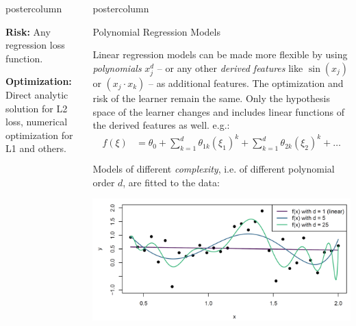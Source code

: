 \documentclass{beamer}
\newlength{\columnheight} %
\begin{document}
\begin{frame}[fragile]{}
\begin{columns}
\begin{column}{.31\textwidth}
\begin{beamercolorbox}[center]{postercolumn}
\begin{minipage}{.98\textwidth}
{\begin{myblock}
  \textbf{Risk:} Any regression loss function.
  
  \vspace*{1ex}
  
  \textbf{Optimization:} Direct analytic solution for L2 loss, numerical optimization for L1 and others.
  \end{myblock}
  
}
\end{minipage}
\end{beamercolorbox}
\end{column}
\begin{column}{.31\textwidth}
\begin{beamercolorbox}[center]{postercolumn}
\begin{minipage}{.98\textwidth}
\parbox[t][\columnheight]{\textwidth}{
  \begin{myblock}{Polynomial Regression Models}
  
    Linear regression models can be made more flexible by using \emph{polynomials} $x_j^d$ -- or any other \emph{derived features} like $\sin(x_j)$ or $(x_j \cdot x_k)$ -- as additional features. The optimization and risk of the learner remain the same.\vspace*{1ex}
    Only the hypothesis space of the learner changes and includes linear functions of the derived features as well. e.g.:
      \begin{align*}
    f(\xi) &= \theta_0 + \sum^d_{k=1} \theta_{1k} \left(\xi_1\right)^k + \sum^d_{k=1} \theta_{2k} \left(\xi_2\right)^k + \dots
    \end{align*}
    
    Models of different \emph{complexity}, i.e. of different polynomial order $d$, are fitted to the data:
    
    \includegraphics[width=0.9\columnwidth]{img/poly_reg.PNG}
  


\end{myblock}}
\end{minipage}
\end{beamercolorbox}
\end{column}
\end{columns}
\end{frame}
\end{document}
